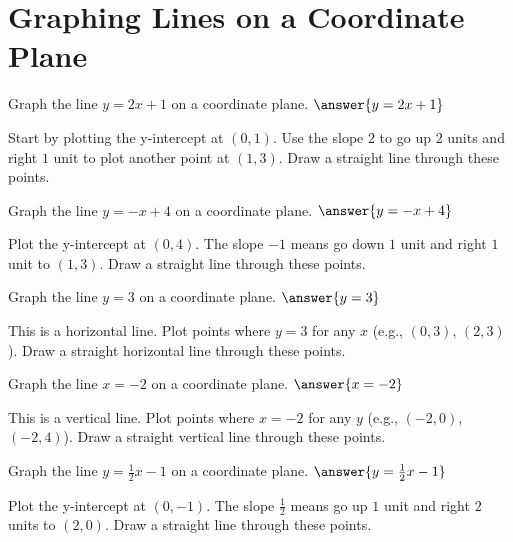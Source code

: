 \documentclass{ximera}
\begin{document}


\section*{Graphing Lines on a Coordinate Plane}

\begin{problem}
Graph the line $y = 2x + 1$ on a coordinate plane. $\answer{y = 2x + 1}$
\begin{feedback}
Start by plotting the y-intercept at $(0, 1)$. Use the slope $2$ to go up $2$ units and right $1$ unit to plot another point at $(1, 3)$. Draw a straight line through these points.
\end{feedback}
\end{problem}

\begin{problem}
Graph the line $y = -x + 4$ on a coordinate plane. $\answer{y = -x + 4}$
\begin{feedback}
Plot the y-intercept at $(0, 4)$. The slope $-1$ means go down $1$ unit and right $1$ unit to $(1, 3)$. Draw a straight line through these points.
\end{feedback}
\end{problem}

\begin{problem}
Graph the line $y = 3$ on a coordinate plane. $\answer{y = 3}$
\begin{feedback}
This is a horizontal line. Plot points where $y = 3$ for any $x$ (e.g., $(0, 3)$, $(2, 3)$). Draw a straight horizontal line through these points.
\end{feedback}
\end{problem}

\begin{problem}
Graph the line $x = -2$ on a coordinate plane. $\answer{x = -2}$
\begin{feedback}
This is a vertical line. Plot points where $x = -2$ for any $y$ (e.g., $(-2, 0)$, $(-2, 4)$). Draw a straight vertical line through these points.
\end{feedback}
\end{problem}

\begin{problem}
Graph the line $y = \frac{1}{2}x - 1$ on a coordinate plane. $\answer{y = \frac{1}{2}x - 1}$
\begin{feedback}
Plot the y-intercept at $(0, -1)$. The slope $\frac{1}{2}$ means go up $1$ unit and right $2$ units to $(2, 0)$. Draw a straight line through these points.
\end{feedback}
\end{problem}
\end{document}
